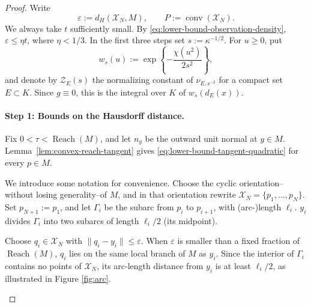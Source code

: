 \documentclass{article}
\newcommand{\Reach}{\operatorname{Reach}}
\numberwithin{equation}{section}
\newcommand{\Xcal}{\mathcal{X}}
\newcommand{\eps}{\varepsilon}
\renewcommand{\epsilon}{\eps}
\newcommand{\x}{\boldsymbol{x}}
\begin{document}
\begin{proof}
Write
\[
 \epsilon:=d_H(\mathcal X_N,M),
 \qquad
 P:=\operatorname{conv}(\mathcal X_N).
\]
We always take $t$ sufficiently small. By
\eqref{eq:lower-bound-observation-density},
$\epsilon\le\eta t$, where $\eta<1/3$. In the first three steps set
$s:=\kappa^{-1/2}$. For $u\ge0$, put
\[
 w_s(u):=\exp\left\{-\frac{\chi(u^2)}{2s^2}\right\},
\]
and denote by $\mathcal Z_E(s)$ the normalizing constant of
$\nu_{E,s^{-2}}$ for a compact set $E\subset K$. Since $g\equiv0$, this is
the integral over $K$ of $w_s(d_E(x))$.

\paragraph{Step 1: Bounds on the Hausdorff distance.}
Fix $0<\tau<\Reach(M)$, and let $n_y$ be the outward unit normal at
$y\in M$. Lemma~\ref{lem:convex-reach-tangent} gives
\eqref{eq:lower-bound-tangent-quadratic} for every $p\in M$.


We introduce some notation for convenience. Choose the cyclic orientation--without losing generality--of $M$, and in that orientation rewrite $\Xcal_N=\{p_1,\ldots,p_N\}$. Set $p_{N+1}:=p_1$, and let $\Gamma_i$ be the
subarc from $p_i$ to $p_{i+1}$, with (arc-)length
$\ell_i$. $y_i$ divides $\Gamma_i$ into two subarcs of length $\ell_i/2$ (its midpoint). 

Choose
$q_i\in\mathcal X_N$ with $\|q_i-y_i\|\le\epsilon$. When $\epsilon$ is
smaller than a fixed fraction of $\Reach(M)$, $q_i$ lies on the same local
branch of $M$ as $y_i$. Since the interior of $\Gamma_i$ contains no
points of $\mathcal X_N$, its arc-length distance from $y_i$ is at least
$\ell_i/2$, as illustrated in Figure \ref{fig:arc}.
\begin{center}
\end{center}
\end{proof}
\end{document}
